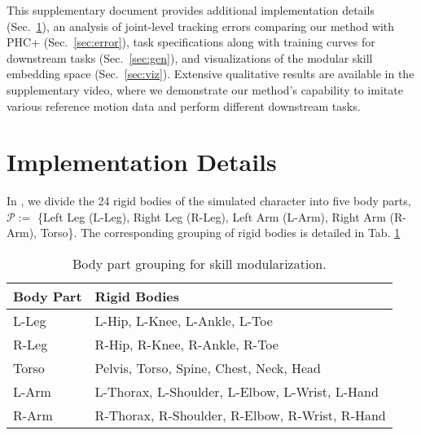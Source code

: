 \clearpage
\setcounter{page}{1}
\setcounter{section}{0}
\maketitlesupplementary

\noindent This supplementary document provides additional implementation details (Sec.~\ref{sec:details}), an analysis of joint-level tracking errors comparing our method with PHC+ \cite{luo2024universal} (Sec.~\ref{sec:error}), task specifications along with training curves for downstream tasks (Sec.~\ref{sec:gen}), and visualizations of the modular skill embedding space (Sec.~\ref{sec:viz}). Extensive qualitative results are available in the supplementary video, where we demonstrate our method's capability to imitate various reference motion data and perform different downstream tasks.

\section{Implementation Details}
\label{sec:details}

In \name, we divide the 24 rigid bodies of the simulated character into five body parts, $\mathcal{P} := $ \{Left Leg (L-Leg), Right Leg (R-Leg), Left Arm (L-Arm), Right Arm (R-Arm), Torso\}. The corresponding grouping of rigid bodies is detailed in Tab. \ref{tab:group} 

\begin{table}[h]
    \centering
    \small
    \caption{Body part grouping for skill modularization.}
    \begin{tabular}{@{}l|l@{}}
        \toprule
        Body Part & Rigid Bodies \\ 
        \midrule
        L-Leg & L-Hip, L-Knee, L-Ankle, L-Toe\\
        R-Leg & R-Hip, R-Knee, R-Ankle, R-Toe\\
        Torso & Pelvis, Torso, Spine, Chest, Neck, Head\\
        L-Arm & L-Thorax, L-Shoulder, L-Elbow, L-Wrist, L-Hand\\
        R-Arm & R-Thorax, R-Shoulder, R-Elbow, R-Wrist, R-Hand\\
        \bottomrule
    \end{tabular}
    \label{tab:group}
\end{table}

